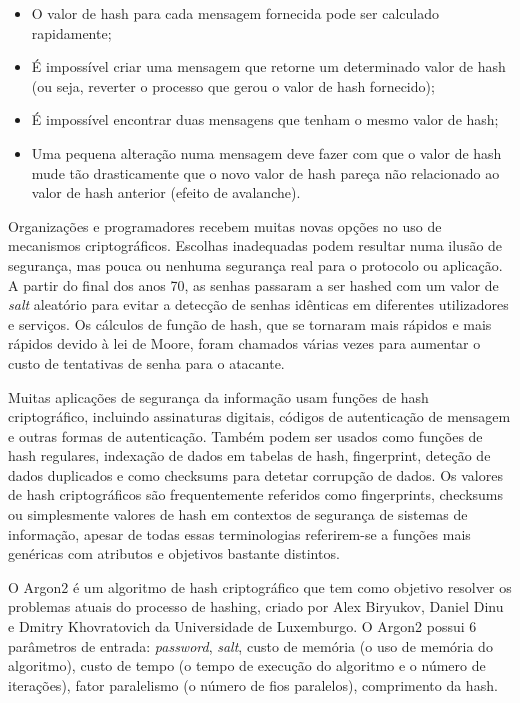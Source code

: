 \documentclass[conference]{IEEEtran}
\begin{document}
\begin{itemize}
\item O valor de hash para cada mensagem fornecida pode ser calculado rapidamente;
\item É impossível criar uma mensagem que retorne um determinado valor de hash (ou seja, reverter o processo 
que gerou o valor de hash fornecido);
\item É impossível encontrar duas mensagens que tenham o mesmo valor de hash;
\item Uma pequena alteração numa mensagem deve fazer com que o valor de hash mude tão drasticamente 
que o novo valor de hash pareça não relacionado ao valor de hash anterior (efeito de avalanche).
\end{itemize} \cite{al2011cryptographic}

Organizações e programadores recebem muitas novas opções no uso de mecanismos criptográficos. 
Escolhas inadequadas podem resultar numa ilusão de segurança, mas pouca ou nenhuma segurança 
real para o protocolo ou aplicação.
A partir do final dos anos 70, as 
senhas passaram a ser hashed com um valor de \textit{salt} aleatório para evitar a 
detecção de senhas idênticas em diferentes utilizadores e serviços. Os 
cálculos de função de hash, que se tornaram mais rápidos e mais rápidos 
devido à lei de Moore, foram chamados várias vezes para aumentar o custo 
de tentativas de senha para o atacante. \cite{argon2spec}

Muitas aplicações de segurança da informação usam funções de hash criptográfico, incluindo 
assinaturas digitais, códigos de autenticação de mensagem e outras formas de autenticação. 
Também podem ser usados como funções de hash regulares, indexação de dados em tabelas de hash, 
fingerprint, deteção de dados duplicados e como 
checksums para detetar corrupção de dados. Os valores de hash criptográficos são frequentemente 
referidos como fingerprints, checksums ou simplesmente valores de hash em contextos de 
segurança de sistemas de informação, apesar de todas essas terminologias referirem-se a funções mais 
genéricas com atributos e objetivos bastante distintos. \cite{hashwiki}

O Argon2 é um algoritmo de hash criptográfico que tem como objetivo resolver 
os problemas atuais do processo de hashing, criado por Alex Biryukov, 
Daniel Dinu e Dmitry Khovratovich da Universidade de Luxemburgo. O Argon2 
possui 6 parâmetros de entrada: \textit{password}, \textit{salt}, custo de memória (o uso de 
memória do algoritmo), custo de tempo (o tempo de execução do algoritmo e o 
número de iterações), fator paralelismo (o número de fios paralelos), 
comprimento da hash.
\end{document}
